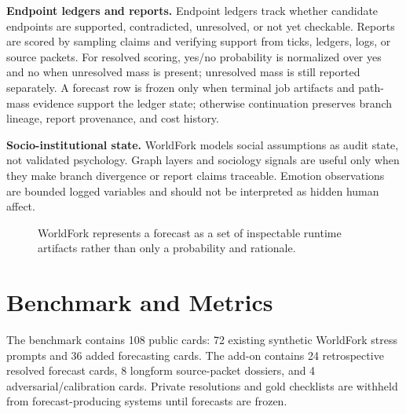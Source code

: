 \documentclass{article}
\begin{document}
\textbf{Endpoint ledgers and reports.} Endpoint ledgers track whether candidate endpoints are supported, contradicted, unresolved, or not yet checkable. Reports are scored by sampling claims and verifying support from ticks, ledgers, logs, or source packets. For resolved scoring, yes/no probability is normalized over yes and no when unresolved mass is present; unresolved mass is still reported separately. A forecast row is frozen only when terminal job artifacts and path-mass evidence support the ledger state; otherwise continuation preserves branch lineage, report provenance, and cost history.

\textbf{Socio-institutional state.} WorldFork models social assumptions as audit state, not validated psychology. Graph layers and sociology signals are useful only when they make branch divergence or report claims traceable. Emotion observations are bounded logged variables and should not be interpreted as hidden human affect.

\begin{figure}[t]
\centering
{}
\caption{WorldFork represents a forecast as a set of inspectable runtime artifacts rather than only a probability and rationale.}
\label{fig:protocol}
\end{figure}

\section{Benchmark and Metrics}

The benchmark contains 108 public cards: 72 existing synthetic WorldFork stress prompts and 36 added forecasting cards. The add-on contains 24 retrospective resolved forecast cards, 8 longform source-packet dossiers, and 4 adversarial/calibration cards. Private resolutions and gold checklists are withheld from forecast-producing systems until forecasts are frozen.
\end{document}
